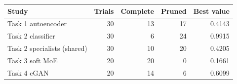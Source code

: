 \begin{tabular}{lrrrr}
\toprule
Study & Trials & Complete & Pruned & Best value \\
\midrule
Task 1 autoencoder & 30 & 13 & 17 & 0.4143 \\
Task 2 classifier & 30 & 6 & 24 & 0.9915 \\
Task 2 specialists (shared) & 30 & 10 & 20 & 0.4205 \\
Task 3 soft MoE & 20 & 20 & 0 & 0.1661 \\
Task 4 cGAN & 20 & 14 & 6 & 0.6099 \\
\bottomrule
\end{tabular}
